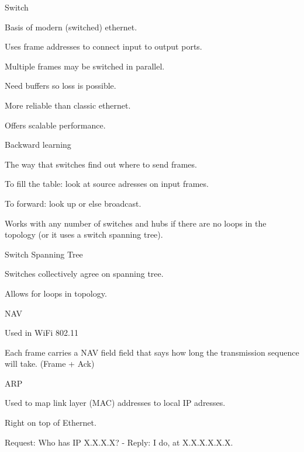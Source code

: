 \documentclass[main.tex]{subfiles}
\begin{document}
\begin{card}{Switch}
\item Basis of modern (switched) ethernet.
\item Uses frame addresses to connect input to output ports.
\item Multiple frames may be switched in parallel.
\item Need buffers so loss is possible.
\item More reliable than classic ethernet.
\item Offers scalable performance.
\end{card}

\begin{card}{Backward learning}
\item The way that switches find out where to send frames.
\item To fill the table: look at source adresses on input frames.
\item To forward: look up or else broadcast.
\item Works with any number of switches and hubs if there are no loops in the topology (or it uses a switch spanning tree).
\end{card}

\begin{card}{Switch Spanning Tree}
\item Switches collectively agree on spanning tree.
\item Allows for loops in topology.
\end{card}

\begin{card}{NAV}
\item Used in WiFi 802.11
\item Each frame carries a NAV field field that says how long the transmission sequence will take. (Frame + Ack)
\end{card}

\begin{card}{ARP}
\item Used to map link layer (MAC) addresses to local IP adresses.
\item Right on top of Ethernet.
\item Request: Who has IP X.X.X.X? - Reply: I do, at X.X.X.X.X.X.
\end{card}
\end{document}
